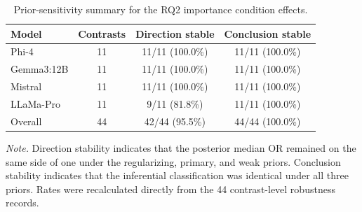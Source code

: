 \begin{table}[tbp]
\caption{Prior-sensitivity summary for the RQ2 importance condition effects.}
\label{tab:rq2_importance_prior_sensitivity_summary}
\begin{tabular}{lccc}
\toprule
Model & Contrasts & Direction stable & Conclusion stable \\
\midrule
Phi-4 & 11 & 11/11 (100.0\%) & 11/11 (100.0\%) \\
Gemma3:12B & 11 & 11/11 (100.0\%) & 11/11 (100.0\%) \\
Mistral & 11 & 11/11 (100.0\%) & 11/11 (100.0\%) \\
LLaMa-Pro & 11 & 9/11 (81.8\%) & 11/11 (100.0\%) \\
Overall & 44 & 42/44 (95.5\%) & 44/44 (100.0\%) \\
\bottomrule
\end{tabular}
\vspace{2pt}
\begin{minipage}{\linewidth}
\footnotesize\textit{Note.} Direction stability indicates that the posterior median OR remained on the same side of one under the regularizing, primary, and weak priors. Conclusion stability indicates that the inferential classification was identical under all three priors. Rates were recalculated directly from the 44 contrast-level robustness records.
\end{minipage}
\end{table}
